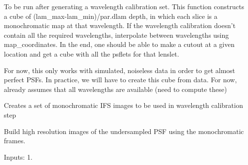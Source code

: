 \documentclass[letterpaper,10pt,english]{sphinxmanual}
\begin{document}

\begin{fulllineitems}
\label{tools:tools.wavecal.createPolychrome}
To be run after generating a wavelength calibration set.
This function constructs a cube of (lam\_max-lam\_min)/par.dlam depth,
in which each slice is a monochromatic map at that wavelength.
If the wavelength calibration doesn't contain all the required wavelengths,
interpolate between wavelengths using map\_coordinates.
In the end, one should be able to make a cutout at a given location and get a cube
with all the psflets for that lenslet.

For now, this only works with simulated, noiseless data in order to get
almost perfect PSFs. In practice, we will have to create this cube from data.
For now, already assumes that all wavelengths are available (need to compute these)

\end{fulllineitems}


\begin{fulllineitems}
\label{tools:tools.wavecal.createWavecalFiles}
Creates a set of monochromatic IFS images to be used in wavelength calibration step

\end{fulllineitems}


\begin{fulllineitems}
\label{tools:tools.wavecal.do_inspection}
\end{fulllineitems}


\begin{fulllineitems}
\label{tools:tools.wavecal.gethires}
Build high resolution images of the undersampled PSF using the
monochromatic frames.

Inputs:
1.

\end{fulllineitems}
\end{document}
